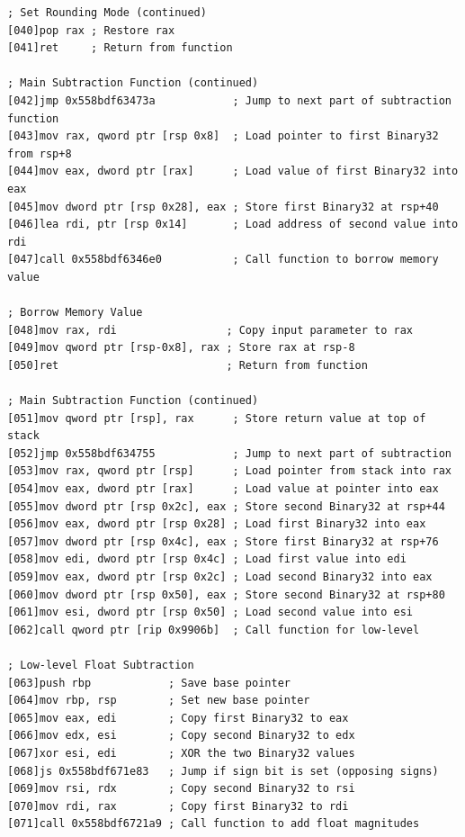 \documentclass[12pt,letter]{article}
\begin{document}
\begin{lstlisting}[style=rust, caption={Annotated Binary32 Normal Case Subtraction Instruction Trace}, label={fig:ieee_subtract}]
; Set Rounding Mode (continued)
[040]pop rax ; Restore rax
[041]ret     ; Return from function

; Main Subtraction Function (continued)
[042]jmp 0x558bdf63473a            ; Jump to next part of subtraction function
[043]mov rax, qword ptr [rsp 0x8]  ; Load pointer to first Binary32 from rsp+8
[044]mov eax, dword ptr [rax]      ; Load value of first Binary32 into eax
[045]mov dword ptr [rsp 0x28], eax ; Store first Binary32 at rsp+40
[046]lea rdi, ptr [rsp 0x14]       ; Load address of second value into rdi
[047]call 0x558bdf6346e0           ; Call function to borrow memory value

; Borrow Memory Value
[048]mov rax, rdi                 ; Copy input parameter to rax
[049]mov qword ptr [rsp-0x8], rax ; Store rax at rsp-8
[050]ret                          ; Return from function

; Main Subtraction Function (continued)
[051]mov qword ptr [rsp], rax      ; Store return value at top of stack
[052]jmp 0x558bdf634755            ; Jump to next part of subtraction
[053]mov rax, qword ptr [rsp]      ; Load pointer from stack into rax
[054]mov eax, dword ptr [rax]      ; Load value at pointer into eax
[055]mov dword ptr [rsp 0x2c], eax ; Store second Binary32 at rsp+44
[056]mov eax, dword ptr [rsp 0x28] ; Load first Binary32 into eax
[057]mov dword ptr [rsp 0x4c], eax ; Store first Binary32 at rsp+76
[058]mov edi, dword ptr [rsp 0x4c] ; Load first value into edi
[059]mov eax, dword ptr [rsp 0x2c] ; Load second Binary32 into eax
[060]mov dword ptr [rsp 0x50], eax ; Store second Binary32 at rsp+80
[061]mov esi, dword ptr [rsp 0x50] ; Load second value into esi
[062]call qword ptr [rip 0x9906b]  ; Call function for low-level

; Low-level Float Subtraction
[063]push rbp            ; Save base pointer
[064]mov rbp, rsp        ; Set new base pointer
[065]mov eax, edi        ; Copy first Binary32 to eax
[066]mov edx, esi        ; Copy second Binary32 to edx
[067]xor esi, edi        ; XOR the two Binary32 values
[068]js 0x558bdf671e83   ; Jump if sign bit is set (opposing signs)
[069]mov rsi, rdx        ; Copy second Binary32 to rsi
[070]mov rdi, rax        ; Copy first Binary32 to rdi
[071]call 0x558bdf6721a9 ; Call function to add float magnitudes


\end{lstlisting}
\end{document}
